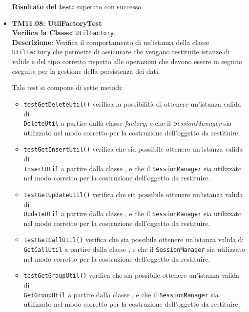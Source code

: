 \begin{itemize}
\begin{itemize}
\end{itemize}
\textbf{Risultato del test:} superato con successo.

\item \textbf{TM11.08: UtilFactoryTest}\\
\textbf{Verifica la Classe:} \texttt{UtilFactory}.\\
\textbf{Descrizione}: Verifica il comportamento di un'istanza della classe \texttt{UtilFactory} che permette di assicurare che vengano restituite istanze di  valide e del tipo corretto rispetto alle operazioni che devono essere in seguito eseguite per la gestione della persistenza dei dati.

Tale test si compone di sette metodi:
\begin{itemize}
\item \texttt{testGetDeleteUtil()} verifica la possibilità di ottenere un'istanza valida di \\ \texttt{DeleteUtil} a partire dalla classe \textit{factory}, e che il \textit{SessionManager} sia utilizzato nel modo corretto per la costruzione dell'oggetto da restituire.

\item \texttt{testGetInsertUtil()} verifica che sia possibile ottenere un'istanza valida di \\ \texttt{InsertUtil} a partire dalla classe , e che il \texttt{SessionManager} sia utilizzato nel modo corretto per la costruzione dell'oggetto da restituire.

\item \texttt{testGetUpdateUtil()} verifica che sia possibile ottenere un'istanza valida di \\ \texttt{UpdateUtil} a partire dalla classe , e che il \texttt{SessionManager} sia utilizzato nel modo corretto per la costruzione dell'oggetto da restituire.

\item \texttt{testGetCallUtil()} verifica che sia possibile ottenere un'istanza valida di \\ \texttt{GetCallUtil} a partire dalla classe , e che il \texttt{SessionManager} sia utilizzato nel modo corretto per la costruzione dell'oggetto da restituire.

\item \texttt{testGetGroupUtil()} verifica che sia possibile ottenere un'istanza valida di \\ \texttt{GetGroupUtil} a partire dalla classe , e che il \texttt{SessionManager} sia utilizzato nel modo corretto per la costruzione dell'oggetto da restituire.


\end{itemize}
\end{itemize}
